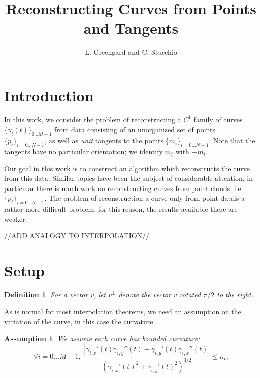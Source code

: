\documentclass{article}
\newtheorem{definition}[cntr]{Definition}
\newtheorem{assumption}{Assumption}
\numberwithin{cntr}{section}
\numberwithin{equation}{section}
\newcommand{\abs}[1]{\left| #1 \right|}%
\newcommand{\Oto}[1]{{0 \ldots #1-1}}
\newcommand{\OtoN}{{0 \ldots N-1}}
\newcommand{\pointData}{{ \{ p_{i} \}_{i=\OtoN} }}
\newcommand{\tanData}{{ \{ m_{i} \}_{i=\OtoN} }}
\newcommand{\curveSet}{{ \{ \gamma_i(t) \}_{\Oto{M}}}}
\newcommand{\kmax}{{\kappa_{m}}}
\begin{document}
\title{Reconstructing Curves from Points and Tangents}

\author{L. Greengard and C. Stucchio}

\maketitle

\section{Introduction}

In this work, we consider the problem of reconstructing a $C^{1}$ family of curves $\curveSet$ from data consisting of an unorganized set of points $\pointData$, as well as \emph{unit} tangents to the points $\tanData$. Note that the tangents have no particular orientation; we identify $m_{i}$ with $-m_{i}$.

Our goal in this work is to construct an algorithm which reconstructs the curve from this data. Similar topics have been the subject of considerable attention, in particular there is much work\cite{amenta98crust,amenta98new,dey99curve,hoppe92surface,amenta02simple, dey01reconstructing} on reconstructing curves from point clouds, i.e. $\pointData$. The problem of reconstruction a curve only from point datais a rather more difficult problem; for this reason, the results available there are weaker.

//ADD ANALOGY TO INTERPOLATION//

\section{Setup}

\begin{definition}
  \label{def:perp}
  For a vector $v$, let $v^{\perp}$ denote the vector $v$ rotated $\pi/2$ to the right.
\end{definition}

As is normal for most interpolation theorems, we need an assumption on the variation of the curve, in this case the curvature.

\begin{assumption}
  We assume each curve has bounded curvature:
  \begin{equation}
    \label{eq:curvatureAssumption}
    \forall i = \Oto{M}, ~ \frac{
      \abs{\gamma_{i,x}'(t) \gamma_{i,y}''(t) - \gamma_{i,y}'(t) \gamma_{i,x}''(t)}
    } {
      (\gamma_{i,x}'(t)^{2}+\gamma_{i,y}'(t)^{2})^{3/2}
    } \leq \kmax
  \end{equation}
\end{assumption}
\end{document}
